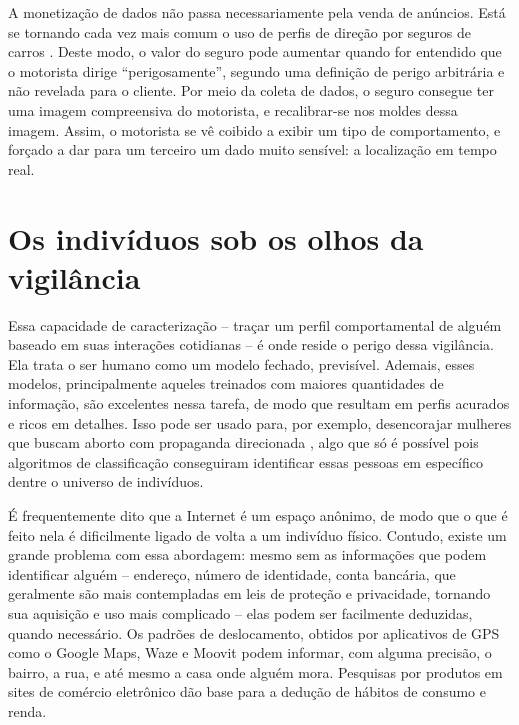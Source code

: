 A monetização de dados não passa necessariamente pela venda de anúncios.
Está se tornando cada vez mais comum o uso de perfis de direção por seguros de carros \cite{mckinsey_monetizing_2016, hill_automakers_2024}.
Deste modo, o valor do seguro pode aumentar quando for entendido que o motorista dirige ``perigosamente'', segundo uma definição de perigo arbitrária e não revelada para o cliente.
Por meio da coleta de dados, o seguro consegue ter uma imagem compreensiva do motorista, e recalibrar-se nos moldes dessa imagem.
Assim, o motorista se vê coibido a exibir um tipo de comportamento, e forçado a dar para um terceiro um dado muito sensível: a localização em tempo real.

\section{Os indivíduos sob os olhos da vigilância}

Essa capacidade de caracterização -- traçar um perfil comportamental de alguém baseado em suas interações cotidianas -- é onde reside o perigo dessa vigilância.
Ela trata o ser humano como um modelo fechado, previsível.
Ademais, esses modelos, principalmente aqueles treinados com maiores quantidades de informação, são excelentes nessa tarefa, de modo que resultam em perfis acurados e ricos em detalhes.
Isso pode ser usado para, por exemplo, desencorajar mulheres que buscam aborto com propaganda direcionada \cite{coutts_antichoice_2016}, algo que só é possível pois algoritmos de classificação conseguiram identificar essas pessoas em específico dentre o universo de indivíduos.

É frequentemente dito que a Internet é um espaço anônimo, de modo que o que é feito nela é dificilmente ligado de volta a um indivíduo físico. 
Contudo, existe um grande problema com essa abordagem: mesmo sem as informações que podem identificar alguém 
-- endereço, número de identidade, conta bancária, que geralmente são mais contempladas em leis de proteção e privacidade, tornando sua aquisição e uso mais complicado -- 
elas podem ser facilmente deduzidas, quando necessário.
Os padrões de deslocamento, obtidos por aplicativos de GPS como o Google Maps, Waze e Moovit podem informar, com alguma precisão, o bairro, a rua, e até mesmo a casa onde alguém mora.
Pesquisas por produtos em sites de comércio eletrônico dão base para a dedução de hábitos de consumo e renda.

